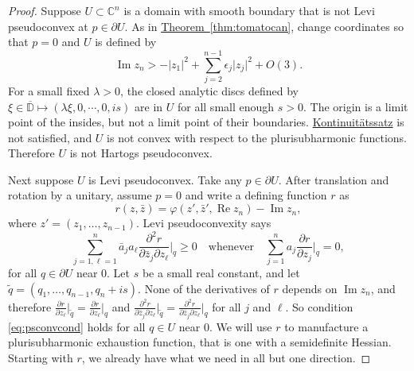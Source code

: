 \documentclass[12pt,openany]{book}
\renewcommand{\Re}{\operatorname{Re}}
\renewcommand{\Im}{\operatorname{Im}}
\newcommand{\sabs}[1]{\lvert {#1} \rvert}
\newcommand{\C}{{\mathbb{C}}}
\newcommand{\D}{{\mathbb{D}}}
\theoremstyle{plain}
\theoremstyle{remark}
\theoremstyle{definition}
\theoremstyle{exercise}
\theoremstyle{example}
\newcommand{\thmref}[1]{\hyperref[#1]{Theorem~\ref*{#1}}}
\begin{document}
\begin{proof}
Suppose
$U \subset \C^n$ is a domain with smooth boundary that is not
Levi pseudoconvex at $p \in \partial U$.
As in
\thmref{thm:tomatocan}, change coordinates so that $p=0$ and $U$ is defined
by
\begin{equation*}
\Im z_n > - \sabs{z_1}^2 + \sum_{j=2}^{n-1} \epsilon_j \sabs{z_j}^2 + O(3) .
\end{equation*}
For a small fixed $\lambda > 0$, the
closed analytic discs defined by $\xi \in \overline{\D} \mapsto (\lambda \xi, 0, \cdots, 0, is)$
are in $U$ for all small enough $s > 0$.  The origin
is a limit point of the insides, but not a limit point of their boundaries.
\hyperref[thm:contprinciple]{Kontinuit\"atssatz} is not satisfied, and $U$ is not 
convex with respect to the plurisubharmonic functions.  Therefore 
$U$ is not Hartogs pseudoconvex.

Next suppose $U$ is Levi pseudoconvex.  Take any $p \in \partial U$.
After translation and rotation by a unitary, assume $p=0$ and
write a defining function $r$ as
\begin{equation*}
r(z,\bar{z}) = \varphi(z',\bar{z}',\Re z_n) - \Im z_n ,
\end{equation*}
where $z' = (z_1,\ldots,z_{n-1})$.
Levi pseudoconvexity says 
\begin{equation} \label{eq:psconvcond}
\sum_{j=1,\ell=1}^n
\bar{a}_j a_\ell \frac{\partial^2 r}{\partial \bar{z}_j \partial z_\ell} \Big|_q \geq 0 
\quad \text{whenever} \quad
\sum_{j=1}^n
a_j \frac{\partial r}{\partial z_j} \Big|_q = 0 ,
\end{equation}
for all $q \in \partial U$ near $0$.
Let $s$ be a small real constant,
and let $\widetilde{q} = (q_1,\ldots,q_{n-1},q_n + is)$.
None of the derivatives of $r$ depends on $\Im z_n$, and therefore
$\frac{\partial r}{\partial z_\ell} \big|_{\widetilde{q}} =
\frac{\partial r}{\partial z_\ell} \big|_{q}$ and
$\frac{\partial^2 r}{\partial \bar{z}_j \partial z_\ell} \big|_{\widetilde{q}} =
\frac{\partial^2 r}{\partial \bar{z}_j \partial z_\ell} \big|_{q}$
for all $j$ and $\ell$.
So condition \eqref{eq:psconvcond} holds for all $q \in U$ near $0$.
We will use $r$ to manufacture a plurisubharmonic exhaustion function, that
is one with a semidefinite Hessian.  Starting with $r$, we already
have what we need in all but one direction.


\end{proof}
\end{document}
